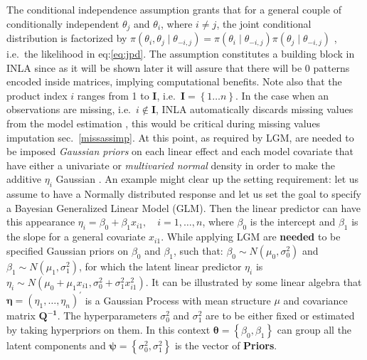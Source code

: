 \documentclass[
  12pt,
  a4paper,
  oneside]{book}
\theoremstyle{definition}
\theoremstyle{definition}
\theoremstyle{definition}
\theoremstyle{remark}
\begin{document}
The conditional independence assumption grants that for a general couple of conditionally independent \(\theta_j\) and \(\theta_i\), where \(i \neq j\), the joint conditional distribution is factorized by \(\pi\left(\theta_{i}, \theta_{j} \mid \theta_{-i, j}\right)=\pi\left(\theta_{i} \mid \theta_{-i, j}\right) \pi\left(\theta_{j} \mid \theta_{-i, j}\right)\) \citep{Blangiardo-Cameletti}, i.e.~the likelihood in eq:\eqref{eq:jpd}. The assumption constitutes a building block in INLA since as it will be shown later it will assure that there will be 0 patterns encoded inside matrices, implying computational benefits.
Note also that the product index \(i\) ranges from 1 to \(\mathbf{I}\), i.e.~\(\mathbf{I} = \left\{1 \ldots n \right\}\). In the case when an observations are missing, i.e.~\(i \notin \mathbf{I}\), INLA automatically discards missing values from the model estimation \citeyearpar{Bayesian_INLA_Rubio}, this would be critical during missing values imputation sec.~\ref{missassimp}.
At this point, as required by LGM, are needed to be imposed \emph{Gaussian priors} on each linear effect and each model covariate that have either a univariate or \emph{multivaried normal} density in order to make the additive \(\eta_i\) Gaussian \citeyearpar{wang2018bayesian}.
An example might clear up the setting requirement: let us assume to have a Normally distributed response and let us set the goal to specify a Bayesian Generalized Linear Model (GLM). Then the linear predictor can have this appearance \(\eta_{i}=\beta_{0}+\beta_{1} x_{i 1}, \quad i=1, \ldots, n\), where \(\beta_{0}\) is the intercept and \(\beta_{1}\) is the slope for a general covariate \(x_{i1}\). While applying LGM are \textbf{needed} to be specified Gaussian priors on \(\beta_{0}\) and \(\beta_{1}\), such that: \(\beta_{0} \sim N\left(\mu_{0}, \sigma_{0}^{2}\right)\) and \(\beta_{1} \sim N\left(\mu_{1}, \sigma_{1}^{2}\right)\), for which the latent linear predictor \(\eta_i\) is \(\eta_{i} \sim N\left(\mu_{0}+\mu_{1} x_{i 1}, \sigma_{0}^{2}+\sigma_{1}^{2} x_{i 1}^{2}\right)\). It can be illustrated by some linear algebra \citeyearpar{wang2018bayesian} that \(\boldsymbol{\eta}=\left(\eta_{1}, \ldots, \eta_{n}\right)^{\prime}\) is a Gaussian Process with mean structure \(\mu\) and covariance matrix \(\boldsymbol{Q^{-1}}\). The hyperparameters \(\sigma_{0}^{2}\) and
\(\sigma_{1}^{2}\) are to be either fixed or estimated by taking hyperpriors on them. In this context \(\boldsymbol{\theta}=\left\{\beta_{0}, \beta_{1}\right\}\) can group all the latent components and \(\boldsymbol{\psi} = \left\{\sigma_{0}^{2},\sigma_{1}^{2}\right\}\) is the vector of \textbf{Priors}.
\end{document}
